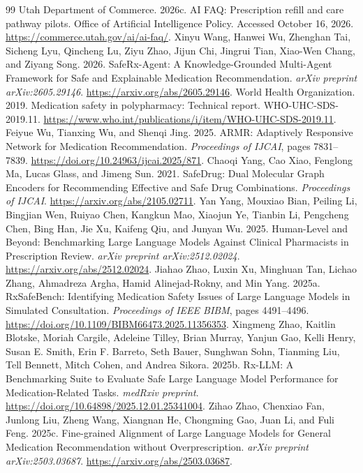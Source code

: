 \begin{thebibliography}{99}
 Utah Department of Commerce. 2026c. AI FAQ: Prescription refill and care pathway pilots. Office of Artificial Intelligence Policy. Accessed October 16, 2026. \url{https://commerce.utah.gov/ai/ai-faq/}.
 Xinyu Wang, Hanwei Wu, Zhenghan Tai, Sicheng Lyu, Qincheng Lu, Ziyu Zhao, Jijun Chi, Jingrui Tian, Xiao-Wen Chang, and Ziyang Song. 2026. SafeRx-Agent: A Knowledge-Grounded Multi-Agent Framework for Safe and Explainable Medication Recommendation. \emph{arXiv preprint arXiv:2605.29146}. \url{https://arxiv.org/abs/2605.29146}.
 World Health Organization. 2019. Medication safety in polypharmacy: Technical report. WHO-UHC-SDS-2019.11. \url{https://www.who.int/publications/i/item/WHO-UHC-SDS-2019.11}.
 Feiyue Wu, Tianxing Wu, and Shenqi Jing. 2025. ARMR: Adaptively Responsive Network for Medication Recommendation. \emph{Proceedings of IJCAI}, pages 7831--7839. \url{https://doi.org/10.24963/ijcai.2025/871}.
 Chaoqi Yang, Cao Xiao, Fenglong Ma, Lucas Glass, and Jimeng Sun. 2021. SafeDrug: Dual Molecular Graph Encoders for Recommending Effective and Safe Drug Combinations. \emph{Proceedings of IJCAI}. \url{https://arxiv.org/abs/2105.02711}.
 Yan Yang, Mouxiao Bian, Peiling Li, Bingjian Wen, Ruiyao Chen, Kangkun Mao, Xiaojun Ye, Tianbin Li, Pengcheng Chen, Bing Han, Jie Xu, Kaifeng Qiu, and Junyan Wu. 2025. Human-Level and Beyond: Benchmarking Large Language Models Against Clinical Pharmacists in Prescription Review. \emph{arXiv preprint arXiv:2512.02024}. \url{https://arxiv.org/abs/2512.02024}.
 Jiahao Zhao, Luxin Xu, Minghuan Tan, Lichao Zhang, Ahmadreza Argha, Hamid Alinejad-Rokny, and Min Yang. 2025a. RxSafeBench: Identifying Medication Safety Issues of Large Language Models in Simulated Consultation. \emph{Proceedings of IEEE BIBM}, pages 4491--4496. \url{https://doi.org/10.1109/BIBM66473.2025.11356353}.
 Xingmeng Zhao, Kaitlin Blotske, Moriah Cargile, Adeleine Tilley, Brian Murray, Yanjun Gao, Kelli Henry, Susan E. Smith, Erin F. Barreto, Seth Bauer, Sunghwan Sohn, Tianming Liu, Tell Bennett, Mitch Cohen, and Andrea Sikora. 2025b. Rx-LLM: A Benchmarking Suite to Evaluate Safe Large Language Model Performance for Medication-Related Tasks. \emph{medRxiv preprint}. \url{https://doi.org/10.64898/2025.12.01.25341004}.
 Zihao Zhao, Chenxiao Fan, Junlong Liu, Zheng Wang, Xiangnan He, Chongming Gao, Juan Li, and Fuli Feng. 2025c. Fine-grained Alignment of Large Language Models for General Medication Recommendation without Overprescription. \emph{arXiv preprint arXiv:2503.03687}. \url{https://arxiv.org/abs/2503.03687}.

\end{thebibliography}

